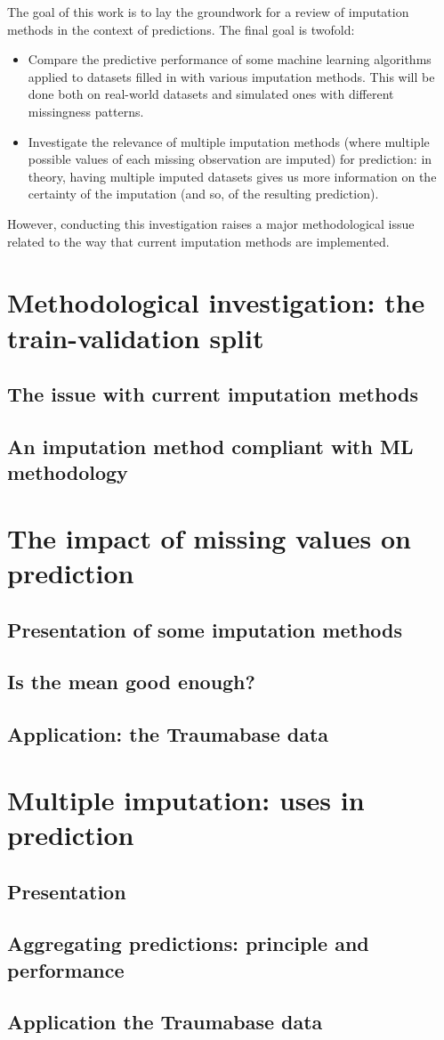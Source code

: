 \documentclass[12pt, a4paper]{article}
\begin{document}
The goal of this work is to lay the groundwork for a review of imputation methods in the context of predictions. The final goal is twofold:
\begin{itemize}
\item Compare the predictive performance of some machine learning algorithms applied to datasets filled in with various imputation methods. This will be done both on real-world datasets and simulated ones with different missingness patterns.
\item Investigate the relevance of multiple imputation methods (where multiple possible values of each missing observation are imputed) for prediction: in theory, having multiple imputed datasets gives us more information on the certainty of the imputation (and so, of the resulting prediction).
\end{itemize}

However, conducting this investigation raises a major methodological issue related to the way that current imputation methods are implemented. 

\section{Methodological investigation: the train-validation split}
\subsection{The issue with current imputation methods}
\subsection{An imputation method compliant with ML methodology}

\section{The impact of missing values on prediction}
\subsection{Presentation of some imputation methods}
\subsection{Is the mean good enough?}
\subsection{Application: the Traumabase data}

\section{Multiple imputation: uses in prediction}
\subsection{Presentation}
\subsection{Aggregating predictions: principle and performance}
\subsection{Application the Traumabase data}
\end{document}
